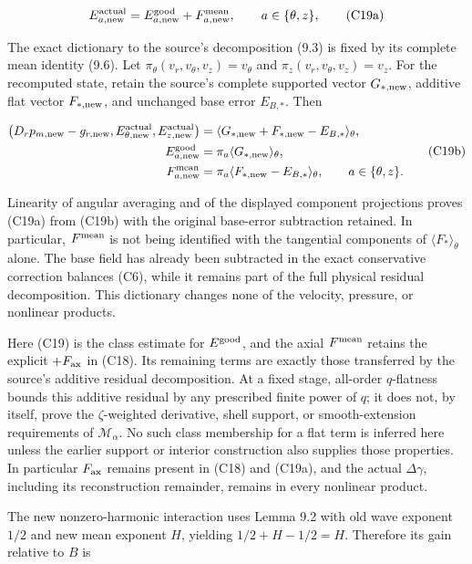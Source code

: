 \documentclass[10pt,a4paper]{article}
\newcounter{none}
\begin{document}
\[
E^{\rm actual}_{a,\rm new}
=E^{\rm good}_{a,\rm new}+F^{\rm mean}_{a,\rm new},
\qquad a\in\{\theta,z\},
\tag{C19a}
\]

The exact dictionary to the source's decomposition (9.3) is fixed by its complete mean identity (9.6). Let \(\pi_\theta(v_r,v_\theta,v_z)=v_\theta\) and \(\pi_z(v_r,v_\theta,v_z)=v_z\). For the recomputed state, retain the source's complete supported vector \(G_{*,\rm new}\), additive flat vector \(F_{*,\rm new}\), and unchanged base error \(E_{B,*}\). Then

\[
\begin{aligned}
\bigl(D_rp_{m,\rm new}-g_{r,\rm new},
E^{\rm actual}_{\theta,\rm new},E^{\rm actual}_{z,\rm new}\bigr)
&=\langle G_{*,\rm new}+F_{*,\rm new}-E_{B,*}\rangle_\theta,\\
E^{\rm good}_{a,\rm new}&=\pi_a\langle G_{*,\rm new}\rangle_\theta,\\
F^{\rm mean}_{a,\rm new}&=\pi_a\langle F_{*,\rm new}-E_{B,*}\rangle_\theta,
\qquad a\in\{\theta,z\}.
\end{aligned}
\tag{C19b}
\]

Linearity of angular averaging and of the displayed component projections proves (C19a) from (C19b) with the original base-error subtraction retained. In particular, \(F^{\rm mean}\) is not being identified with the tangential components of \(\langle F_*\rangle_\theta\) alone. The base field has already been subtracted in the exact conservative correction balances (C6), while it remains part of the full physical residual decomposition. This dictionary changes none of the velocity, pressure, or nonlinear products.

Here (C19) is the class estimate for \(E^{\rm good}\), and the axial \(F^{\rm mean}\) retains the explicit \(+F_{\rm ax}\) in (C18). Its remaining terms are exactly those transferred by the source's additive residual decomposition. At a fixed stage, all-order \(q\)-flatness bounds this additive residual by any prescribed finite power of \(q\); it does not, by itself, prove the \(\zeta\)-weighted derivative, shell support, or smooth-extension requirements of \(\mathcal M_\alpha\). No such class membership for a flat term is inferred here unless the earlier support or interior construction also supplies those properties. In particular \(F_{\rm ax}\) remains present in (C18) and (C19a), and the actual \(\Delta\gamma\), including its reconstruction remainder, remains in every nonlinear product.

The new nonzero-harmonic interaction uses Lemma 9.2 with old wave exponent \(1/2\) and new mean exponent \(H\), yielding \(1/2+H-1/2=H\). Therefore its gain relative to \(B\) is
\end{document}
